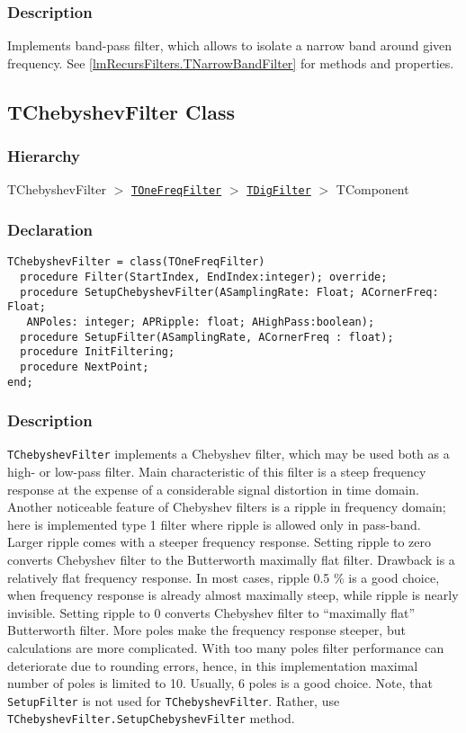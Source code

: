 \documentclass[12pt,a4paper,oneside]{report}
\newcommand{\code}[1]{\texttt{#1}}
\begin{document}
\subsubsection{Description}
Implements band-pass filter, which allows to isolate a narrow band around given frequency. See \ref{lmRecursFilters.TNarrowBandFilter} for methods and properties. 
\subsection{TChebyshevFilter Class}
\label{lmRecursFilters.TChebyshevFilter}
\subsubsection{Hierarchy}
TChebyshevFilter {$>$} \hyperref[lmfilters.TOneFreqFilter]{\code{TOneFreqFilter}} {$>$} \hyperref[lmfilters.TDigFilter]{\code{TDigFilter}} {$>$} TComponent
\subsubsection{Declaration}
\begin{verbatim}
TChebyshevFilter = class(TOneFreqFilter)
  procedure Filter(StartIndex, EndIndex:integer); override;
  procedure SetupChebyshevFilter(ASamplingRate: Float; ACornerFreq: Float;
   ANPoles: integer; APRipple: float; AHighPass:boolean);
  procedure SetupFilter(ASamplingRate, ACornerFreq : float); 
  procedure InitFiltering; 
  procedure NextPoint;
end;
\end{verbatim}
\subsubsection{Description}
\code{TChebyshevFilter} implements a Chebyshev filter, which may be used both as a high- or low-pass filter. Main characteristic of this filter is a steep frequency response at the expense of a considerable signal distortion in time domain. Another noticeable feature of Chebyshev filters is a ripple in frequency domain; here is implemented type 1 filter where ripple is allowed only in pass-band. Larger ripple comes with a steeper frequency response. Setting ripple to zero converts Chebyshev filter to the Butterworth maximally flat filter. Drawback is a relatively flat frequency response. In most cases, ripple 0.5 \% is a good choice, when frequency response is already almost maximally steep, while ripple is nearly invisible. Setting ripple to 0 converts Chebyshev filter to ``maximally flat'' Butterworth filter. More poles make the frequency response steeper, but calculations are more complicated. With too many  poles filter performance can deteriorate due to rounding errors, hence, in this implementation maximal number of poles is limited to 10. Usually, 6 poles is a good choice. Note, that \code{SetupFilter} is not used for \code{TChebyshevFilter}. Rather, use \code{TChebyshevFilter.SetupChebyshevFilter} method.
\end{document}
